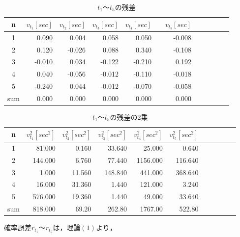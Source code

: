 \documentclass[a4paper,1pt]{jsarticle}
\begin{document}
\begin{table}[H]
  \caption{$t_1〜t_5$の残差}
  \label{table:SpeedOfLight}
  \centering
  \begin{tabular}{|c||r|r|r|r|r|r|r|r|r|r|}
    \hline
    n & $v_{t_1}[sec]$ & $v_{t_2}[sec]$ & $v_{t_3}[sec]$ & $v_{t_4}[sec]$ & $v_{t_5}[sec]$　\\

    \hline\hline
    1 & 0.090 & 0.004 & 0.058 & 0.050 & -0.008 \\
    2 & 0.120 & -0.026 & 0.088 & 0.340 & -0.108 \\
    3 & -0.010 & 0.034 & -0.122 & -0.210 & 0.192 \\
    4 & 0.040 & -0.056 & -0.012 & -0.110 & -0.018 \\
    5 & -0.240 & 0.044 & -0.012 & -0.070 & -0.058 \\


    \hline\hline
    sum & 0.000 & 0.000 & 0.000 & 0.000 & 0.000 \\

    \hline
  \end{tabular}


\end{table}

\begin{table}[H]
  \caption{$t_1〜t_5$の残差の2乗}
  \label{table:SpeedOfLight}
  \centering
  \begin{tabular}{|c||r|r|r|r|r|r|r|r|r|r|}
    \hline
    n & $v_{t_1}^2[sec^2]$ & $v_{t_2}^2[sec^2]$ & $v_{t_3}^2[sec^2]$ & $v_{t_4}^2[sec^2]$ & $v_{t_5}^2[sec^2]$ \\

    \hline\hline
    1 & 81.000 & 0.160 & 33.640 & 25.000 & 0.640 \\
    2 & 144.000 & 6.760 & 77.440 & 1156.000 & 116.640 \\
    3 & 1.000 & 11.560 & 148.840 & 441.000 & 368.640 \\
    4 & 16.000 & 31.360 & 1.440 & 121.000 & 3.240 \\
    5 & 576.000 & 19.360 & 1.440 & 49.000 & 33.640 \\

    \hline\hline
    sum & 818.000 & 69.20 & 262.80 & 1767.00 & 522.80 \\

    \hline
  \end{tabular}


\end{table}

$確率誤差r_{t_1}〜r_{t_5}は，理論(1)より，$\\
\end{document}
